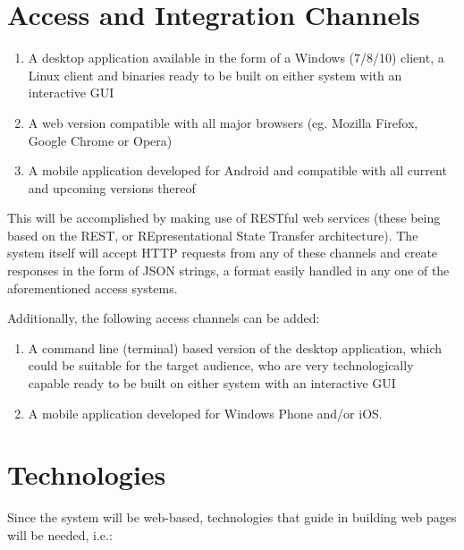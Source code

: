 \documentclass[hidelinks,a4paper,12pt]{article}
\begin{document}
		
		
		
\section{Access and Integration Channels}
	\begin{enumerate}
		\item A desktop application available in the form of a Windows (7/8/10) client, a Linux client and binaries
		ready to be built on either system with an interactive GUI
		\item A web version compatible with all major browsers (eg. Mozilla Firefox, Google Chrome or Opera)
		\item A mobile application developed for Android and compatible with all current and upcoming versions thereof
	\end{enumerate}
	
	\begin{flushleft}
		This will be accomplished by making use of RESTful web services (these being based on the REST, or REpresentational State Transfer architecture). The system itself will accept HTTP requests from any of these channels
		and create responses in the form of JSON strings, a format easily handled in any one of the aforementioned access
		systems.
		
		Additionally, the following access channels can be added:
	\end{flushleft}
	
	\begin{enumerate}
		\item A command line (terminal) based version of the desktop application, which could be suitable for the target
		audience, who are very technologically capable
		ready to be built on either system with an interactive GUI
		\item A mobile application developed for Windows Phone and/or iOS.
	\end{enumerate}

\section{Technologies}
	Since the system will be web-based, technologies that guide in building web pages will be needed, i.e.:
	
\end{document}
